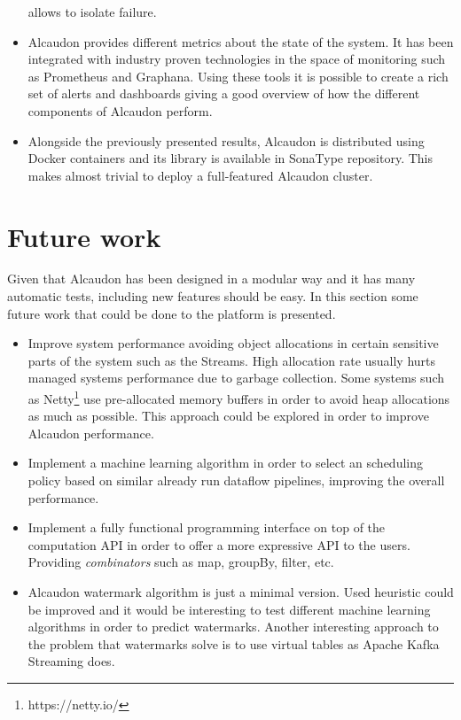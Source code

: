 \begin{itemize}
  allows to isolate failure.
\item Alcaudon provides different metrics about the state of the system. It has been
  integrated with industry proven technologies in the space of monitoring such as
  Prometheus and Graphana. Using these tools it is possible to create a rich set
  of alerts and dashboards giving a good overview of how the different components
  of Alcaudon perform.
\item Alongside the previously presented results, Alcaudon is distributed using Docker
  containers and its library is available in SonaType repository. This makes almost
  trivial to deploy a full-featured Alcaudon cluster.
\end{itemize}

\section{Future work}

Given that Alcaudon has been designed in a modular way and it has many automatic
tests, including new features should be easy. In this section some future work
that could be done to the platform is presented.

\begin{itemize}
\item Improve system performance avoiding object allocations in certain
  sensitive parts of the system such as the Streams. High allocation rate
  usually hurts managed systems performance due to garbage collection. Some
  systems such as Netty\footnote{https://netty.io/} use pre-allocated memory buffers
  in order to avoid heap allocations as much as possible. This approach could be
  explored in order to improve Alcaudon performance.
\item Implement a machine learning algorithm in order to select an scheduling policy
  based on similar already run dataflow pipelines, improving the overall performance.
\item Implement a fully functional programming interface on top of the
  computation API in order to offer a more expressive API to the users.
  Providing \textit{combinators} such as map, groupBy, filter, etc.
\item Alcaudon watermark algorithm is just a minimal version. Used heuristic
  could be improved and it would be interesting to test different machine
  learning algorithms in order to predict watermarks. Another interesting
  approach to the problem that watermarks solve is to use virtual tables as
  Apache Kafka Streaming does\cite{kafka}.
\end{itemize}
